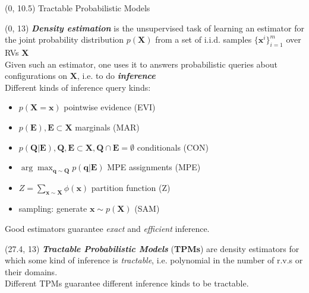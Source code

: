 \documentclass[final]{beamer}
\begin{document}
\begin{frame}{}
  
  \begin{textblock}{80}(0, 10.5)
    Tractable Probabilistic Models
  \end{textblock}
  
  
  \begin{textblock}{25.2}(0, 13)
    \small
    \emph{\textbf{Density estimation}} is the unsupervised task of
    learning an estimator for the joint probability distribution
    $p(\mathbf{X})$ from a set of i.i.d. samples $\{\mathbf
    x^i\}_{i=1}^m$ over RVs $\mathbf{X}$\\[20pt]
    
    Given such an estimator, one uses it to answers
    probabilistic queries about configurations on $\mathbf{X}$,
    i.e. to do \emph{\textbf{inference}}\\[20pt]
    
    Different kinds of inference query kinds:
    \begin{itemize}
    \item $p(\mathbf{X} = \mathbf{x})$ pointwise evidence (EVI) 
    \item $p(\mathbf{E}), \mathbf{E}\subset\mathbf{X}$ marginals (MAR)
    \item $p(\mathbf{Q}|\mathbf{E}), \mathbf{Q},
      \mathbf{E}\subset\mathbf{X}, \mathbf{Q}\cap \mathbf{E}=\emptyset$
      conditionals (CON)
    \item $\arg\max_{\mathbf{q}\sim\mathbf{Q}}p(\mathbf{q}|\mathbf{E})$
      MPE assignments (MPE)
    \item $Z =\sum_{\mathbf{x}\sim \mathbf{X}}\phi(\mathbf{x})$
      partition function (Z)
      \item sampling: generate $\mathbf{x}\sim p(\mathbf{X})$ (SAM)
    \end{itemize}\vspace{20pt}
    
    Good estimators guarantee \emph{exact} and \emph{efficient} inference.

  \end{textblock}
  
  \begin{textblock}{25.2}(27.4, 13)
    \small
    \emph{\textbf{Tractable Probabilistic Models}}  (\textbf{TPMs})
    are density estimators for which some kind of inference is
    \emph{tractable}, i.e. polynomial in the number of r.v.s or their
    domains.\\[20pt]

    Different TPMs guarantee different inference kinds to be tractable.
  \end{textblock}
  

\end{frame}
\end{document}
